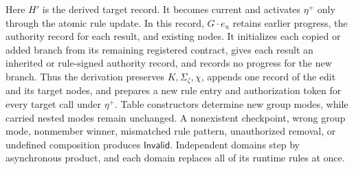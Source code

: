 Here \(H'\) is the derived target record.
It becomes current and activates \(\eta^+\) only through the atomic rule update.
In this record, \(G\mathbin{\cdot}e_u\) retains earlier progress, the authority record for each result, and existing nodes.
It initializes each copied or added branch from its remaining registered contract, gives each result an inherited or rule-signed authority record, and records no progress for the new branch.
Thus the derivation preserves \(K,\Sigma_\zeta,\chi\), appends one record of the edit and its target nodes, and prepares a new rule entry and authorization token for every target call under \(\eta^+\).
Table constructors determine new group modes, while carried nested modes remain unchanged.
A nonexistent checkpoint, wrong group mode, nonmember winner, mismatched rule pattern, unauthorized removal, or undefined composition produces \(\mathsf{Invalid}\).
Independent domains step by asynchronous product, and each domain replaces all of its runtime rules at once.

